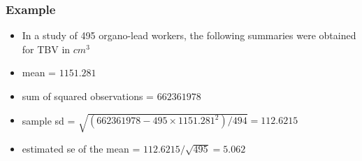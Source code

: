 \documentclass[aspectratio=169]{beamer}
\begin{document}
\begin{frame}\frametitle{Example} 
  \begin{itemize}
  \item In a study of 495 organo-lead workers, the
    following summaries were obtained for TBV in $cm^3$
  \item mean = $1151.281$
  \item sum of squared observations = $662361978$
  \item sample sd = $\sqrt{(662361978 - 495 \times 1151.281^2)/494} = 112.6215$
  \item estimated se of the mean = $112.6215 / \sqrt{495} = 5.062$
  \end{itemize}
\end{frame}
\end{document}
